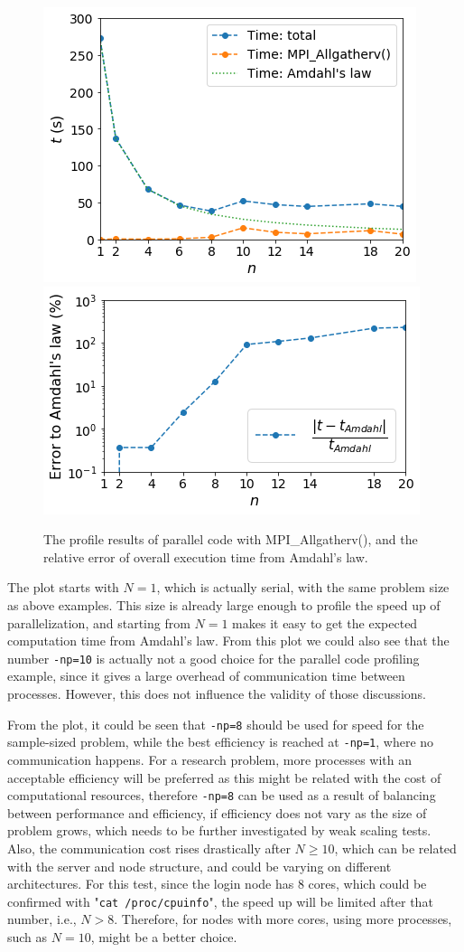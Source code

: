 \documentclass{article}
\begin{document}
\begin{spacing}{1.1}
\begin{figure}[H]
  \centering
  \includegraphics[width=0.5\linewidth]{output/scaling-updated.png}
  \includegraphics[width=0.5\linewidth]{output/scaling-error.png}
  \caption{The profile results of parallel code with MPI\_Allgatherv(), and the relative error of overall execution time from Amdahl's law.}
  \label{fig-testcase}
\end{figure}

The plot starts with $N=1$, which is actually serial, with the same problem size as above examples. This size is already large enough to profile the speed up of parallelization, and starting from $N=1$ makes it easy to get the expected computation time from Amdahl's law. From this plot we could also see that the number \texttt{-np=10} is actually not a good choice for the parallel code profiling example, since it gives a large overhead of communication time between processes. However, this does not influence the validity of those discussions.

From the plot, it could be seen that \texttt{-np=8} should be used for speed for the sample-sized problem, while the best efficiency is reached at \texttt{-np=1}, where no communication happens. For a research problem, more processes with an acceptable efficiency will be preferred as this might be related with the cost of computational resources, therefore \texttt{-np=8} can be used as a result of balancing between performance and efficiency, if efficiency does not vary as the size of problem grows, which needs to be further investigated by weak scaling tests. Also, the communication cost rises drastically after $N \geq 10$, which can be related with the server and node structure, and could be varying on different architectures. For this test, since the login node has 8 cores, which could be confirmed with "\texttt{cat /proc/cpuinfo}", the speed up will be limited after that number, i.e., $N > 8$. Therefore, for nodes with more cores, using more processes, such as $N=10$, might be a better choice.


\end{spacing}
\end{document}
